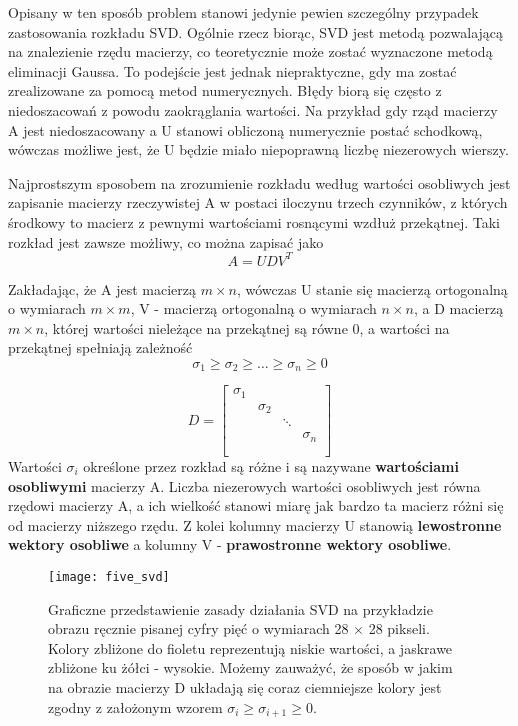 \documentclass[12pt]{article}
\begin{document}
Opisany w ten sposób problem stanowi jedynie pewien szczególny przypadek zastosowania rozkładu SVD. Ogólnie rzecz biorąc, SVD jest metodą pozwalającą na znalezienie rzędu macierzy, co teoretycznie może zostać wyznaczone metodą eliminacji Gaussa. To podejście jest jednak niepraktyczne, gdy ma zostać zrealizowane za pomocą metod numerycznych. Błędy biorą się często z niedoszacowań z powodu zaokrąglania wartości. Na przykład gdy rząd macierzy A jest niedoszacowany a U stanowi obliczoną numerycznie postać schodkową, wówczas możliwe jest, że U będzie miało niepoprawną liczbę niezerowych wierszy.

Najprostszym sposobem na zrozumienie rozkładu według wartości osobliwych jest zapisanie macierzy rzeczywistej A w postaci iloczynu trzech czynników, z których środkowy to macierz z pewnymi wartościami rosnącymi wzdłuż przekątnej. Taki rozkład jest zawsze możliwy, co można zapisać jako
\[A = UDV^T \]

Zakładając, że A jest macierzą $m \times n$, wówczas U stanie się macierzą ortogonalną o wymiarach $m \times m$, V - macierzą ortogonalną o wymiarach $n \times n$, a D macierzą $m \times n$, której wartości nieleżące na przekątnej są równe 0, a wartości na przekątnej spełniają zależność
\[\sigma_1 \geq \sigma_2 \geq \ldots \geq \sigma_n \geq 0\]

\[
D = \begin{bmatrix}
\sigma_1 & & & \\
& \sigma_2 & & \\
& & \ddots & \\
& & & \sigma_n \\\\
\end{bmatrix}
\]
Wartości $\sigma_i$ określone przez rozkład są różne i są nazywane \textbf{wartościami osobliwymi} macierzy A. Liczba niezerowych wartości osobliwych jest równa rzędowi macierzy A, a ich wielkość stanowi miarę jak bardzo ta macierz różni się od macierzy niższego rzędu. Z kolei kolumny macierzy U stanowią \textbf{lewostronne wektory osobliwe} a kolumny V - \textbf{prawostronne wektory osobliwe}.

\begin{figure}[h]
\centering
\texttt{[image: five\_svd]}
\caption{Graficzne przedstawienie zasady działania SVD na przykładzie obrazu ręcznie pisanej cyfry pięć o wymiarach 28 $\times$ 28 pikseli. Kolory zbliżone do fioletu reprezentują niskie wartości, a jaskrawe zbliżone ku żółci - wysokie. Możemy zauważyć, że sposób w jakim na obrazie macierzy D układają się coraz ciemniejsze kolory jest zgodny z założonym wzorem $\sigma_i \geq \sigma_{i+1} \geq 0$.}
\end{figure}
\end{document}
